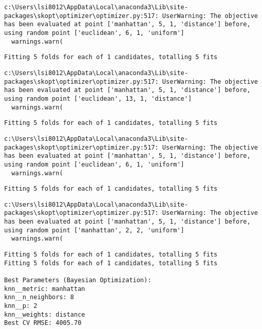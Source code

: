 \documentclass[
  letterpaper,
  DIV=11,
  numbers=noendperiod]{scrreprt}
\begin{document}
\begin{verbatim}
c:\Users\lsi8012\AppData\Local\anaconda3\Lib\site-packages\skopt\optimizer\optimizer.py:517: UserWarning: The objective has been evaluated at point ['manhattan', 5, 1, 'distance'] before, using random point ['euclidean', 6, 1, 'uniform']
  warnings.warn(
\end{verbatim}

\begin{verbatim}
Fitting 5 folds for each of 1 candidates, totalling 5 fits
\end{verbatim}

\begin{verbatim}
c:\Users\lsi8012\AppData\Local\anaconda3\Lib\site-packages\skopt\optimizer\optimizer.py:517: UserWarning: The objective has been evaluated at point ['manhattan', 5, 1, 'distance'] before, using random point ['euclidean', 13, 1, 'distance']
  warnings.warn(
\end{verbatim}

\begin{verbatim}
Fitting 5 folds for each of 1 candidates, totalling 5 fits
\end{verbatim}

\begin{verbatim}
c:\Users\lsi8012\AppData\Local\anaconda3\Lib\site-packages\skopt\optimizer\optimizer.py:517: UserWarning: The objective has been evaluated at point ['manhattan', 5, 1, 'distance'] before, using random point ['euclidean', 6, 1, 'uniform']
  warnings.warn(
\end{verbatim}

\begin{verbatim}
Fitting 5 folds for each of 1 candidates, totalling 5 fits
\end{verbatim}

\begin{verbatim}
c:\Users\lsi8012\AppData\Local\anaconda3\Lib\site-packages\skopt\optimizer\optimizer.py:517: UserWarning: The objective has been evaluated at point ['manhattan', 5, 1, 'distance'] before, using random point ['manhattan', 2, 2, 'uniform']
  warnings.warn(
\end{verbatim}

\begin{verbatim}
Fitting 5 folds for each of 1 candidates, totalling 5 fits
Fitting 5 folds for each of 1 candidates, totalling 5 fits

Best Parameters (Bayesian Optimization):
knn__metric: manhattan
knn__n_neighbors: 8
knn__p: 2
knn__weights: distance
Best CV RMSE: 4005.70
\end{verbatim}
\end{document}
